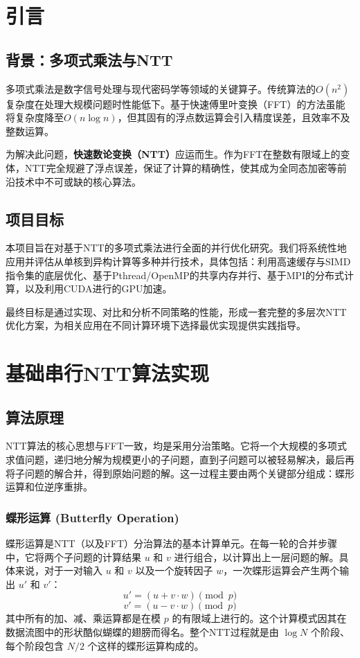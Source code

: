 \documentclass[a4paper]{article}
\begin{document}
\section{引言}
\subsection{背景：多项式乘法与NTT}
多项式乘法是数字信号处理与现代密码学等领域的关键算子。传统算法的$O(n^2)$复杂度在处理大规模问题时性能低下。基于快速傅里叶变换（FFT）的方法虽能将复杂度降至$O(n \log n)$，但其固有的浮点数运算会引入精度误差，且效率不及整数运算。

为解决此问题，\textbf{快速数论变换（NTT）}应运而生。作为FFT在整数有限域上的变体，NTT完全规避了浮点误差，保证了计算的精确性，使其成为全同态加密等前沿技术中不可或缺的核心算法。

\subsection{项目目标}
本项目旨在对基于NTT的多项式乘法进行全面的并行优化研究。我们将系统性地应用并评估从单核到异构计算等多种并行技术，具体包括：利用高速缓存与SIMD指令集的底层优化、基于Pthread/OpenMP的共享内存并行、基于MPI的分布式计算，以及利用CUDA进行的GPU加速。

最终目标是通过实现、对比和分析不同策略的性能，形成一套完整的多层次NTT优化方案，为相关应用在不同计算环境下选择最优实现提供实践指导。

\section{基础串行NTT算法实现}
\subsection{算法原理}
NTT算法的核心思想与FFT一致，均是采用分治策略。它将一个大规模的多项式求值问题，递归地分解为规模更小的子问题，直到子问题可以被轻易解决，最后再将子问题的解合并，得到原始问题的解。这一过程主要由两个关键部分组成：蝶形运算和位逆序重排。

\subsubsection{蝶形运算 (Butterfly Operation)}
蝶形运算是NTT（以及FFT）分治算法的基本计算单元。在每一轮的合并步骤中，它将两个子问题的计算结果 $u$ 和 $v$ 进行组合，以计算出上一层问题的解。具体来说，对于一对输入 $u$ 和 $v$ 以及一个旋转因子 $w$，一次蝶形运算会产生两个输出 $u'$ 和 $v'$：
\[ u' = (u + v \cdot w) \pmod{p} \]
\[ v' = (u - v \cdot w) \pmod{p} \]
其中所有的加、减、乘运算都是在模 $p$ 的有限域上进行的。这个计算模式因其在数据流图中的形状酷似蝴蝶的翅膀而得名。整个NTT过程就是由 $\log N$ 个阶段、每个阶段包含 $N/2$ 个这样的蝶形运算构成的。
\end{document}
